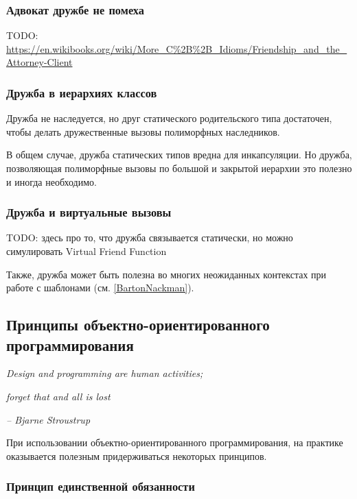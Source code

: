 \documentclass[a4paper,12pt,oneside]{article}
\begin{document}


\subsubsection{Адвокат дружбе не помеха}

TODO: \url{https://en.wikibooks.org/wiki/More_C%2B%2B_Idioms/Friendship_and_the_Attorney-Client}

\subsubsection{Дружба в иерархиях классов}

Дружба не наследуется, но друг статического родительского типа достаточен, чтобы делать дружественные вызовы полиморфных наследников.



В общем случае, дружба статических типов вредна для инкапсуляции. Но дружба, позволяющая полиморфные вызовы по большой и закрытой иерархии это полезно и иногда необходимо. 

\subsubsection{Дружба и виртуальные вызовы}

TODO: здесь про то, что дружба связывается статически, но можно симулировать Virtual Friend Function

Также, дружба может быть полезна во многих неожиданных контекстах при работе с шаблонами (см. \ref{BartonNackman}).

\pagebreak
\subsection{Принципы объектно-ориентированного программирования}\label{SOLID}

\hfill\textit{Design and programming are human activities;}

\hfill\textit{forget that and all is lost}{\vspace{0.5em}}

\hfill\textit{-- Bjarne Stroustrup}

При использовании объектно-ориентированного программирования, на практике оказывается полезным придерживаться некоторых принципов.

\subsubsection{Принцип единственной обязанности}\label{SRP}
\end{document}
